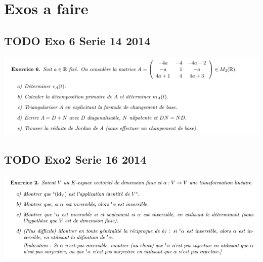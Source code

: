 \documentclass[11pt]{article}
\date{\today}
\title{}
\begin{document}
\tableofcontents

\section{Exos a faire}
\label{sec:org45cd153}
\subsection{{\bfseries\sffamily TODO} Exo 6 Serie 14 2014}
\label{sec:org839a605}
\begin{center}
\includegraphics[width=.9\linewidth]{./Screen_Exos/exo6_serie14_2014.png}
\end{center}

\subsection{{\bfseries\sffamily TODO} Exo2 Serie 16 2014}
\label{sec:org82af672}
\begin{center}
\includegraphics[width=.9\linewidth]{./Screen_Exos/exo2_serie16_2014.png}
\end{center}
\end{document}

